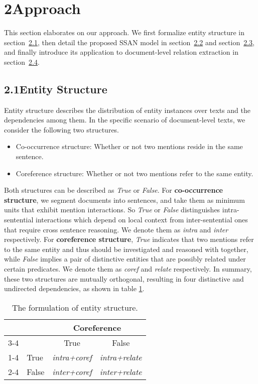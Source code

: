 \documentclass[letterpaper]{article} \usepackage{aaai21}  \usepackage{times}  \usepackage{helvet} \usepackage{courier}  \usepackage[hyphens]{url}  \usepackage{graphicx} \usepackage{booktabs}
\begin{document}
\section{2\quad Approach}
This section elaborates on our approach.
We first formalize entity structure in section~\hyperref[2.1:Structure of Entity]{2.1}, then detail the proposed SSAN model in section~\hyperref[2.2:SSAN]{2.2} and section~\hyperref[2.3:Transformation Module]{2.3}, and finally introduce its application to document-level relation extraction in section~\hyperref[2.3:Relation Extraction]{2.4}.

\subsection{2.1\quad Entity Structure}\label{2.1:Structure of Entity}
Entity structure describes the distribution of entity instances over texts and the dependencies among them.
In the specific scenario of document-level texts, we consider the following two structures.\\
\begin{itemize}
\itemsep-1em 
\item{Co-occurrence structure:} Whether or not two mentions reside in the same sentence.\\
\item{Coreference structure:} Whether or not two mentions refer to the same entity.\\
\end{itemize}
Both structures can be described as \textit{True} or \textit{False}.
For \textbf{co-occurrence structure}, we segment documents into sentences, and take them as minimum units that exhibit mention interactions.
So \textit{True} or \textit{False} distinguishes intra-sentential interactions which depend on local context from inter-sentential ones that require cross sentence reasoning.
We denote them as \textit{intra} and \textit{inter} respectively.
For \textbf{coreference structure}, \textit{True} indicates that two mentions refer to the same entity and thus should be investigated and reasoned with together, while \textit{False} implies a pair of distinctive entities that are possibly related under certain predicates.
We denote them as \textit{coref} and \textit{relate} respectively.
In summary, these two structures are mutually orthogonal, resulting in four distinctive and undirected dependencies, as shown in table \ref{table:1}.

\begin{table}[h!]
\centering
\bgroup
\def\arraystretch{1.2}
\begin{tabular}{|ll|c|c|} 
\hline
&&\multicolumn{2}{c|}{Coreference}\\
\cline{3-4}
&& True & False \\
\cline{1-4}
\multicolumn{1}{|c|}{\multirow{2}*{Co-occurence}}&True&\textit{intra+coref}&\textit{intra+relate}\\
\cline{2-4}
\multicolumn{1}{|l|}{}&False&\textit{inter+coref}&\textit{inter+relate}\\
\hline
\end{tabular}
\egroup
\caption{The formulation of entity structure.}
\label{table:1}
\end{table}
\end{document}

